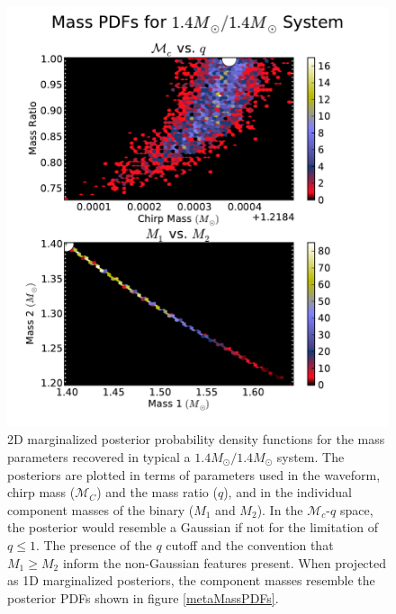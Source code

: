 \documentclass[11pt,a4paper]{emulateapj} 
\newcommand{\chmass}{\mathcal{M}_c}
\begin{document}
\begin{figure}[h!]
  \centering \includegraphics[trim=1cm 0cm 2cm 0cm,
    clip=false,scale=0.63]{1414masses2D.pdf}
 \caption{2D marginalized posterior probability density functions for
   the mass parameters recovered in typical a
   $1.4M_{\odot}/1.4M_{\odot}$ system.  The posteriors are plotted in
   terms of parameters used in the waveform, chirp mass
   ($\mathcal{M}_C$) and the mass ratio ($q$), and in the individual
   component masses of the binary ($M_1$ and $M_2$).  In the
   $\chmass$-$q$ space, the posterior would resemble a Gaussian if not
   for the limitation of $q \leq 1$.  The presence of the $q$ cutoff
   and the convention that $M_1 \geq M_2$ inform the non-Gaussian
   features present.  When projected as 1D marginalized posteriors,
   the component masses resemble the posterior PDFs shown in figure
   \ref{metaMassPDFs}.}
  \label{1414masses}
\end{figure}
\end{document}
